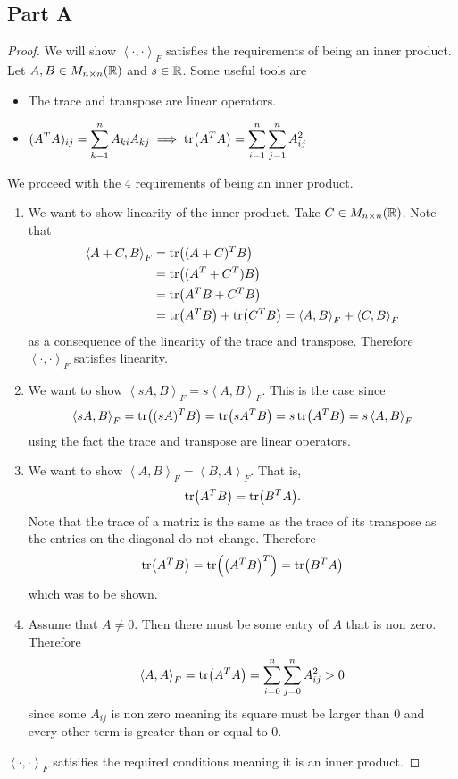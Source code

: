 \documentclass{article}
\newcommand{\iprd}[1]{\left\langle #1 \right\rangle}
\begin{document}
\subsection*{Part A}
\begin{proof}
    We will show $\iprd{\cdot,\cdot}_{F}$ satisfies the requirements of being an inner product. Let $A,B \in M_{n\times n}(\mathbb{R})$ and $s \in \mathbb{R}$. Some useful tools are
    \begin{itemize}
        \item The trace and transpose are linear operators. 
        \item $(A^T A)_{ij} = \displaystyle\sum_{k=1}^n A_{ki} A_{kj} \implies \tr(A^T A) = \sum_{i=1}^n \sum_{j=1}^n A_{ij}^2$
    \end{itemize}
    We proceed with the 4 requirements of being an inner product.
    \begin{enumerate}
        \item 
        We want to show linearity of the inner product. Take $C \in M_{n\times n}(\mathbb{R})$. Note that
        \begin{align*}
            \iprd{A + C, B}_F &= \tr((A+C)^T B) \\
            &= \tr((A^T + C^T) B) \\
            &= \tr(A^T B + C^T B) \\
            &= \tr(A^T B) + \tr(C^T B) = \iprd{A,B}_F + \iprd{C,B}_F
        \end{align*}
        as a consequence of the linearity of the trace and transpose. Therefore $\iprd{\cdot, \cdot}_F$ satisfies linearity.
        \item
            We want to show $\iprd{sA,B}_{F} = s \iprd{A,B}_F$. This is the case since
            \[
                \iprd{sA,B}_F = \tr((sA)^T B) = \tr(sA^T B) = s \tr(A^T B) = s \iprd{A,B}_F
            \]
            using the fact the trace and transpose are linear operators.
        \item
            We want to show $\iprd{A, B}_F = \iprd{B, A}_F$. That is,
            \[
                \tr(A^T B) = \tr(B^T A)
            .\]
            Note that the trace of a matrix is the same as the trace of its transpose as the entries on the diagonal do not change. Therefore
            \[
                \tr(A^T B) = \tr(\qty(A^T B)^T) = \tr(B^T A)
            \]
            which was to be shown.
        \item 
            Assume that $A \neq 0$. Then there must be some entry of $A$ that is non zero. Therefore
            \[
                \iprd{A, A}_F = \tr(A^T A) = \sum_{i = 0}^n \sum_{j=0}^n A_{ij}^2 > 0
            \]
            since some $A_{ij}$ is non zero meaning its square must be larger than $0$ and every other term is greater than or equal to $0$.
    \end{enumerate}
    $\iprd{\cdot, \cdot}_F$ satisifies the required conditions meaning it is an inner product.
\end{proof}
\end{document}
